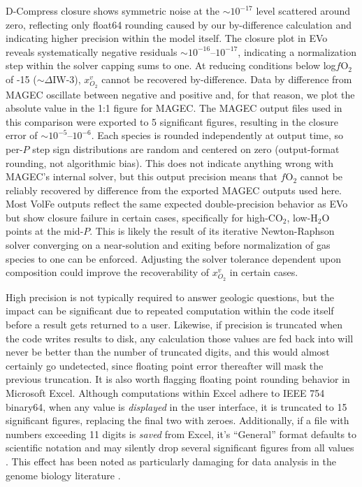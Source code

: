 \documentclass[draft, english]{volcanica-template}
\begin{document}
D-Compress closure shows symmetric noise at the $\sim$$10^{-17}$ level scattered around zero, reflecting only float64 rounding caused by our by-difference calculation and indicating higher precision within the model itself. The closure plot in EVo reveals systematically negative residuals $\sim$$10^{-16}$–$10^{-17}$, indicating a normalization step within the solver capping sums to one. At reducing conditions below log$f$O$_2$ of -15 ($\sim\Delta$IW-3), $x_{O_{2}}^v$ cannot be recovered by-difference. Data by difference from MAGEC oscillate between negative and positive and, for that reason, we plot the absolute value in the 1:1 figure for MAGEC. The MAGEC output files used in this comparison were exported to 5 significant figures, resulting in the closure error of $\sim$$10^{-5}$–$10^{-6}$. Each species is rounded independently at output time, so per-$P$ step sign distributions are random and centered on zero (output-format rounding, not algorithmic bias). This does not indicate anything wrong with MAGEC's internal solver, but this output precision means that $f$O$_2$ cannot be reliably recovered by difference from the exported MAGEC outputs used here. Most VolFe outputs reflect the same expected double-precision behavior as EVo but show closure failure in certain cases, specifically for high-CO$_2$, low-H$_2$O points at the mid-$P$. This is likely the result of its iterative Newton-Raphson solver converging on a near-solution and exiting before normalization of gas species to one can be enforced. Adjusting the solver tolerance dependent upon composition could improve the recoverability of $x_{O_{2}}^v$ in certain cases.

High precision is not typically required to answer geologic questions, but the impact can be significant due to repeated computation within the code itself before a result gets returned to a user. Likewise, if precision is truncated when the code writes results to disk, any calculation those values are fed back into will never be better than the number of truncated digits, and this would almost certainly go undetected, since floating point error thereafter will mask the previous truncation. It is also worth flagging floating point rounding behavior in Microsoft Excel. Although computations within Excel adhere to IEEE 754 binary64, when any value is \textit{displayed} in the user interface, it is truncated to 15 significant figures, replacing the final two with zeroes. Additionally, if a file with numbers exceeding 11 digits is \textit{saved} from Excel, it's ``General'' format defaults to scientific notation and may silently drop several significant figures from all values \parencite{griffiths2022}. This effect has been noted as particularly damaging for data analysis in the genome biology literature \parencite{ziemann2016}.
\end{document}
